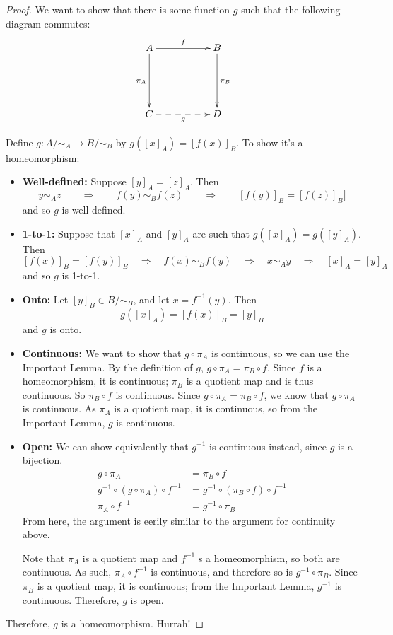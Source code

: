 \begin{proof}
	We want to show that there is some function $g$ such that the following diagram commutes:
	\[ \xymatrix{ A \ar[rr]^f \ar[dd]_{\pi_A} && B \ar[dd]^{\pi_B} \\
	&&\\C \ar @{-->}[rr]_g & & D } \]
	
	\item Define $g:A/\sim_A \to B/\sim_B$ by $g\left([x]_A\right) = \left[ f(x) \right]_B$. To show it's a homeomorphism: 
	\begin{itemize}
		\item {\bf Well-defined:} Suppose $[y]_A = [z]_A$. Then
		\[y\sim_A z\qquad\Rightarrow\qquad f(y) \sim_B f(z) \qquad\Rightarrow \qquad[f(y)]_B = [f(z)]_B]\]
		and so $g$ is well-defined. 
		\item {\bf 1-to-1:} Suppose that $[x]_A$ and $[y]_A$ are such that $g([x]_A) = g([y]_A)$. Then
		\[ [f(x)]_B = [f(y)]_B\quad\Rightarrow\quad f(x)\sim_B f(y)\quad\Rightarrow\quad x\sim_A y \quad\Rightarrow\quad [x]_A = [y]_A\]
		and so $g$ is 1-to-1. 
		\item {\bf Onto: } Let $[y]_B\in B/\sim_B$, and let $x = f^{-1}(y)$. Then
		\[ g([x]_A) = [f(x)]_B = [y]_B \]
		and $g$ is onto. 
		\item {\bf Continuous: } We want to show that $g\circ \pi_A$ is continuous, so we can use the Important Lemma. By the definition of $g$, $g\circ \pi_A = \pi_B\circ f$. Since $f$ is a homeomorphism, it is continuous; $\pi_B$ is a quotient map and is thus continuous. So $\pi_B\circ f$ is continuous. Since $g\circ \pi_A = \pi_B\circ f$, we know that $g\circ \pi_A$ is continuous. As $\pi_A$ is a quotient map, it is continuous, so from the Important Lemma, $g$ is continuous. 
		\item {\bf Open: } We can show equivalently that $g^{-1}$ is continuous instead, since $g$ is a bijection. 
		\begin{align*}
			g\circ\pi_A &= \pi_B\circ f \\
			g^{-1}\circ(g\circ\pi_A)\circ f^{-1} &= g^{-1}\circ(\pi_B\circ f)\circ f^{-1} \\
			\pi_A\circ f^{-1} & =g^{-1}\circ \pi_B 
		\end{align*}
		From here, the argument is eerily similar to the argument for continuity above.
		
		Note that $\pi_A$ is a quotient map and $f^{-1}$ s a homeomorphism, so both are continuous. As such, $\pi_A\circ f^{-1}$ is continuous, and therefore so is $g^{-1}\circ \pi_B$. Since $\pi_B$ is a quotient map, it is continuous; from the Important Lemma, $g^{-1}$ is continuous. Therefore, $g$ is open. 
	\end{itemize}
	Therefore, $g$ is a homeomorphism. Hurrah! 
\end{proof}
